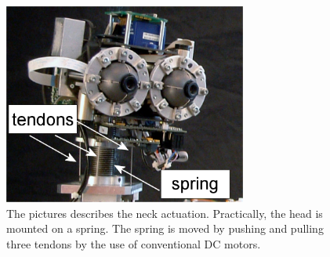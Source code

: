\begin{figure}[tbp]
\centering
\includegraphics[width=80mm]{Figure/Head.jpg}
\caption{The pictures describes the neck actuation. Practically, the head is mounted on a spring. The spring is moved by pushing and pulling three tendons by the use of conventional DC motors.}
\label{Fig:Head}
\end{figure}

